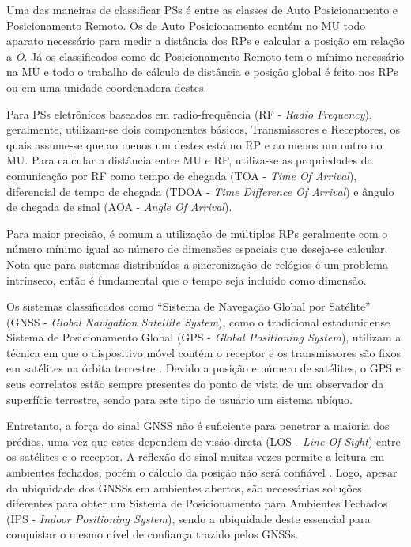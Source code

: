 Uma das maneiras de classificar PSs é entre as classes de Auto Posicionamento e
Posicionamento Remoto. Os de Auto Posicionamento contém no MU todo aparato
necessário para medir a distância dos RPs e calcular a posição em relação a
\emph{O}. Já os classificados como de Posicionamento Remoto tem o mínimo
necessário na MU e todo o trabalho de cálculo de distância e posição global é
feito nos RPs ou em uma unidade coordenadora destes.

Para PSs eletrônicos baseados em radio-frequência (RF - \emph{Radio
Frequency}), geralmente, utilizam-se dois componentes básicos, Transmissores e
Receptores, os quais assume-se que ao menos um destes está no RP e ao menos um
outro no MU. Para calcular a distância entre MU e RP, utiliza-se as propriedades
da comunicação por RF como tempo de chegada (TOA - \emph{Time Of Arrival}),
diferencial de tempo de chegada (TDOA - \emph{Time Difference Of Arrival}) e
ângulo de chegada de sinal (AOA - \emph{Angle Of Arrival}).

Para maior precisão, é comum a utilização de múltiplas RPs geralmente com o
número mínimo igual ao número de dimensões espaciais que deseja-se calcular.
Nota que para sistemas distribuídos a sincronização de relógios é um problema
intrínseco, então é fundamental que o tempo seja incluído como dimensão.

Os sistemas classificados como ``Sistema de Navegação Global por Satélite''
(GNSS - \emph{Global Navigation Satellite System}), como o tradicional
estadunidense Sistema de Posicionamento Global (GPS - \emph{Global Positioning
System}), utilizam a técnica em que o dispositivo móvel contém o receptor e os
transmissores são fixos em satélites na órbita terrestre \cite{Djuknic2001}.
Devido a posição e número de satélites, o GPS e seus correlatos estão sempre
presentes do ponto de vista de um observador da superfície terrestre, sendo para
este tipo de usuário um sistema ubíquo.

Entretanto, a força do sinal GNSS não é suficiente para penetrar a maioria dos
prédios, uma vez que estes dependem de visão direta (LOS -
\emph{Line-Of-Sight}) entre os satélites e o receptor. A reflexão do sinal
muitas vezes permite a leitura em ambientes fechados, porém o cálculo da posição
não será confiável \cite{Chen2000}. Logo, apesar da ubiquidade dos
GNSSs em ambientes abertos, são necessárias soluções diferentes para obter um
Sistema de Posicionamento para Ambientes Fechados (IPS - \emph{Indoor
Positioning System}), sendo a ubiquidade deste essencial para conquistar o mesmo
nível de confiança trazido pelos GNSSs.

